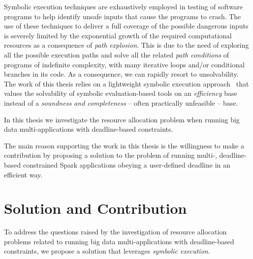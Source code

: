 Symbolic execution techniques are exhaustively employed in testing of software programs to help identify unsafe inputs that cause the programs to crash. The use of these techniques to deliver a full coverage of the possible dangerous inputs is severely limited by the exponential growth of the required computational resources as a consequence of \textit{path explosion}. This is  due to the need of exploring all the possible execution paths and solve all the related  \textit{path conditions} of programs of indefinite complexity, with many iterative loops and/or conditional branches in its code. As a consequence, we can rapidly resort to unsolvability. The work of this thesis relies on a lightweight symbolic execution  approach~\cite{Baresi-Quattrocchi-Denaro:2019} that values the solvability of symbolic evaluation-based tools on an \textit{efficiency} base instead of a \textit{soundness and completeness} -- often practically unfeasible -- base.

In this thesis we investigate the resource allocation problem when running big data multi-\plan applications with deadline-based \qos constraints. 


The main reason supporting the work in this thesis is the willingness to make a contribution by proposing a solution to the problem of running multi-\plan, deadline-based \qos constrained Spark applications obeying a user-defined deadline in an efficient way.

\section{Solution and Contribution}\label{sec:solution_contribution}
To address the questions raised by the investigation of resource allocation problems related to running big data multi-\plan applications with deadline-based \qos constraints, we propose a solution that leverages \textit{symbolic execution}. 

